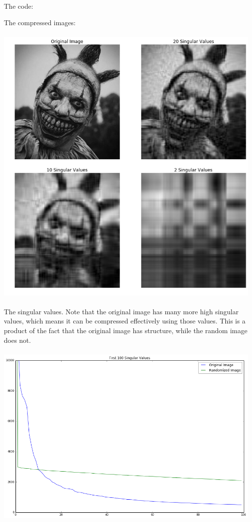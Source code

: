 \documentclass[12pt,letterpaper,fleqn]{hmcpset}
\begin{document}
The code:

The compressed images:\\\\
\includegraphics[scale = .5]{p5comp.png}\\\\
The singular values. Note that the original image has many more high singular values, which means it can be compressed effectively using those values. This is a product of the fact that the original image has structure, while the random image does not.\\\\
\includegraphics[scale = .5]{p5rand.png}\\\\
\end{document}
